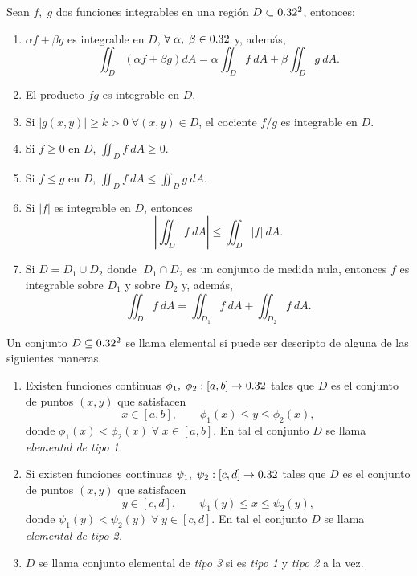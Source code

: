 \begin{propertie}
    Sean $f,\;g$ dos funciones integrables en una regi\'on $D\subset0.32^2$, entonces:
    \begin{enumerate}
        \item[i.] $\alpha f+\beta g$ es integrable en $D$, $\forall\;\alpha,\;\beta\in0.32$ y, adem\'as,
        \[
            \iint_D \left(\alpha f+\beta g\right)dA=\alpha\iint_D f\:dA+\beta\iint_D g\:dA.
        \]
        \item[ii.] El producto $fg$ es integrable en $D$.
        \item[iii.] Si $|g(x,y)|\geq k>0\;\forall(x,y)\in D$, el cociente $f/g$ es integrable en $D$.
        \item[iv.] Si $f\geq 0$ en $D$, $\iint_D f\:dA\geq0$.
        \item[v.]Si $f\leq g$ en $D$, $\iint_D f\:dA\leq\iint_D g\:dA.$
        \item[vi.]Si $|f|$ es integrable en $D$, entonces 
        \[
            \left|\iint_D f\:dA\right|\leq\iint_D|f|\:dA.  
        \]    
        \item[vii.] Si $D=D_1\cup D_2$ donde $\;D_1\cap D_2$ es un conjunto de medida nula, entonces   $f$ es integrable sobre $D_1$ y sobre $D_2$ y, adem\'as,  
        \[
            \iint_D f\:dA=\iint_{D_1} f\:dA+\iint_{D_2}f\:dA.    
        \]
    \end{enumerate}
\end{propertie}

\begin{definition}  Un conjunto  $D\subseteq0.32^2$ se llama elemental si puede ser descripto de alguna de las siguientes maneras. 
   
    \begin{enumerate}
    \item[i.]
    Existen funciones continuas $\phi_1,\;\phi_2:[a,b]\to0.32$ tales que $D$ es el conjunto de puntos $(x,y)$ que satisfacen
    \[
        x\in[a,b], \qquad \phi_1(x)\leq y\leq\phi_2(x),  
    \]%
    donde $\phi_1(x) < \phi_2(x)\;\forall\;x\in[a,b].$  En tal  el conjunto $D$ se llama  \textit{elemental de tipo 1.} 
    \item[ii.]
    Si existen funciones continuas $\psi_1,\;\psi_2:[c,d]\to0.32$ tales que $D$ es el conjunto de puntos $(x,y)$ que satisfacen
    \[
        y\in[c,d], \qquad \psi_1(y)\leq x\leq\psi_2(y),  
    \]
    donde $\psi_1(y) < \psi_2(y)\;\forall\;y\in[c,d].$ En tal  el conjunto $D$ se llama  \textit{elemental de tipo 2.} 
    \item[iii.]
    $D$ se llama conjunto elemental de \textit{tipo 3} si es \textit{tipo 1} y \textit{tipo 2} a la vez.
    
    
    
    \end{enumerate}
\end{definition}

